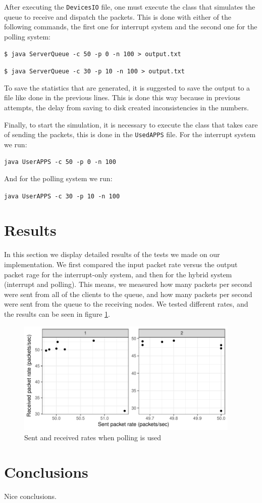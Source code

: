 \documentclass{article}
\begin{document}
After executing the \texttt{DevicesIO} file, one must execute the class that simulates the queue to receive and dispatch the packets. This is done with either of the following commands, the first one for interrupt system and the second one for the polling system:

\texttt{\$ java ServerQueue -c 50 -p 0 -n 100 > output.txt}

\texttt{\$ java ServerQueue -c 30 -p 10 -n 100 > output.txt}

To save the statistics that are generated, it is suggested to save the output to a file like done in the previous lines. This is done this way because in previous attempts, the delay from saving to disk created inconsistencies in the numbers.

Finally, to start the simulation, it is necessary to execute the class that takes care of sending the packets, this is done in the \texttt{UsedAPPS} file. For the interrupt system we run:

\texttt{java UserAPPS -c 50 -p 0 -n 100}

And for the polling system we run:

\texttt{java UserAPPS -c 30 -p 10 -n 100}

\section{Results}

In this section we display detailed results of the tests we made on our implementation. We first compared the input packet rate versus the output packet rage for the interrupt-only system, and then for the hybrid system (interrupt and polling). This means, we measured how many packets per second were sent from all of the clients to the queue, and how many packets per second were sent from the queue to the receiving nodes. We tested different rates, and the results can be seen in figure \ref{fig:polling_rates}.

\begin{figure}[H]
    \centering
    \includegraphics[width=0.95\textwidth]{polling_rates.pdf}
    \caption{Sent and received rates when polling is used}
    \label{fig:polling_rates}
\end{figure}


\section{Conclusions}

Nice conclusions.


\printbibliography
\end{document}
